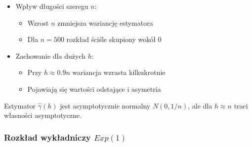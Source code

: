 \documentclass[10pt, a4paper]{article}\usepackage[]{graphicx}\usepackage[]{xcolor}
\begin{document}
\begin{itemize}
\item Wpływ długości szeregu $n$:
  \begin{itemize}
  \item Wzrost $n$ zmniejsza wariancję estymatora
  \item Dla $n=500$ rozkład ściśle skupiony wokół 0
  \end{itemize}

\item Zachowanie dla dużych $h$:
  \begin{itemize}
  \item Przy $h \approx 0.9n$ wariancja wzrasta kilkukrotnie
  \item Pojawiają się wartości odstające i asymetria
  \end{itemize}
\end{itemize}


Estymator $\hat{\gamma}(h)$ jest asymptotycznie normalny $N(0,1/n)$, ale dla $h \approx n$ traci własności asymptotyczne.


\newpage
\subsubsection{Rozkład wykładniczy $Exp(1)$}
\end{document}
